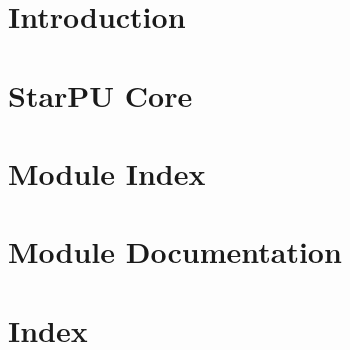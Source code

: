\chapter{Introduction}
\label{index}
\hypertarget{index}{}


\chapter{Star\+PU Core}
\label{StarPUCore}
\hypertarget{StarPUCore}{}


\chapter{Module Index}


\chapter{Module Documentation}
\label{ModuleDocumentation}
\hypertarget{ModuleDocumentation}{}



\chapter{Index}
\printindex


